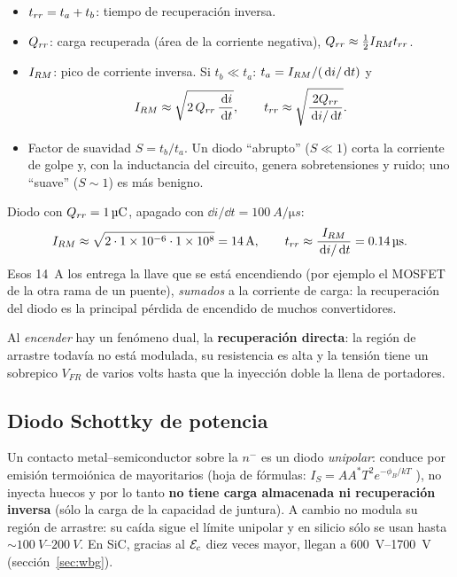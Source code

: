 \begin{definicion}
\begin{itemize}
  \item $t_{rr}=t_a+t_b$: tiempo de recuperación inversa.
  \item $Q_{rr}$: carga recuperada (área de la corriente negativa), $Q_{rr}\approx\tfrac12I_{RM}t_{rr}$.
  \item $I_{RM}$: pico de corriente inversa. Si $t_b\ll t_a$: $t_a=I_{RM}/(\,\mathrm{d} i/\,\mathrm{d} t)$ y
  \[
    I_{RM}\approx\sqrt{2\,Q_{rr}\,\frac{\,\mathrm{d} i}{\,\mathrm{d} t}},\qquad t_{rr}\approx\sqrt{\frac{2Q_{rr}}{\,\mathrm{d} i/\,\mathrm{d} t}}.
  \]
  \item Factor de suavidad $S=t_b/t_a$. Un diodo ``abrupto'' ($S\ll1$) corta la corriente de golpe y,
  con la inductancia del circuito, genera sobretensiones y ruido; uno ``suave'' ($S\sim1$) es más
  benigno.
\end{itemize}
\end{definicion}

\begin{ejemplo}
Diodo con $Q_{rr}=\SI{1}{\micro C}$, apagado con $\dd i/\dd t=\SI{100}{A/\micro s}$:
\[
  I_{RM}\approx\sqrt{2\cdot\num{1e-6}\cdot\num{1e8}}=\SI{14}{A},\qquad
  t_{rr}\approx\frac{I_{RM}}{\,\mathrm{d} i/\,\mathrm{d} t}=\SI{0.14}{\micro s}.
\]
Esos \SI{14}{A} los entrega la llave que se está encendiendo (por ejemplo el MOSFET de la otra
rama de un puente), \emph{sumados} a la corriente de carga: la recuperación del diodo es la principal
pérdida de encendido de muchos convertidores.
\end{ejemplo}

Al \emph{encender} hay un fenómeno dual, la \textbf{recuperación directa}: la región de arrastre
todavía no está modulada, su resistencia es alta y la tensión tiene un sobrepico $V_{FR}$ de varios
volts hasta que la inyección doble la llena de portadores.

\subsection{Diodo Schottky de potencia}

Un contacto metal--semiconductor sobre la $n^-$ es un diodo \emph{unipolar}: conduce por emisión
termoiónica de mayoritarios (hoja de fórmulas: $I_S=AA^*T^2e^{-\phi_B/kT}$ \enhojatexto), no inyecta
huecos y por lo tanto \textbf{no tiene carga almacenada ni recuperación inversa} (sólo la carga de
la capacidad de juntura). A cambio no modula su región de arrastre: su caída sigue el límite
unipolar y en silicio sólo se usan hasta $\sim\SI{100}{V}$--$\SI{200}{V}$. En SiC, gracias al $\mathcal{E}_c$
diez veces mayor, llegan a \SIrange{600}{1700}{V} (sección~\ref{sec:wbg}).
